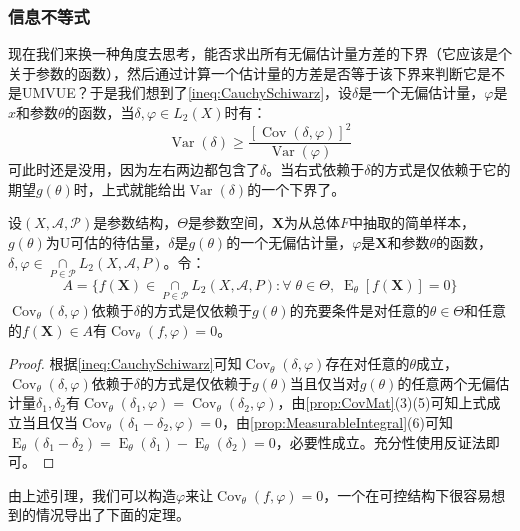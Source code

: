 \subsubsection{信息不等式}
现在我们来换一种角度去思考，能否求出所有无偏估计量方差的下界（它应该是个关于参数的函数），然后通过计算一个估计量的方差是否等于该下界来判断它是不是UMVUE？于是我们想到了\cref{ineq:CauchySchiwarz}，设$\delta$是一个无偏估计量，$\varphi$是$x$和参数$\theta$的函数，当$\delta,\varphi\in L_2(X)$时有：
\begin{equation*}
	\operatorname{Var}(\delta)\geqslant\frac{[\operatorname{Cov}(\delta,\varphi)]^2}{\operatorname{Var}(\varphi)}
\end{equation*}
可此时还是没用，因为左右两边都包含了$\delta$。当右式依赖于$\delta$的方式是仅依赖于它的期望$g(\theta)$时，上式就能给出$\operatorname{Var}(\delta)$的一个下界了。
\begin{lemma}
	设$(X,\mathscr{A},\mathscr{P})$是参数结构，$\Theta$是参数空间，$\mathbf{X}$为从总体$F$中抽取的简单样本，$g(\theta)$为U可估的待估量，$\delta$是$g(\theta)$的一个无偏估计量，$\varphi$是$\mathbf{X}$和参数$\theta$的函数，$\delta,\varphi\in\underset{P\in\mathscr{P}}{\cap}L_2(X,\mathscr{A},P)$。令：
	\begin{equation*}
		A=\{f(\mathbf{X})\in\underset{P\in\mathscr{P}}{\cap}L_2(X,\mathscr{A},P):\forall\;\theta\in\Theta,\;\operatorname{E}_{\theta}[f(\mathbf{X})]=0\}
	\end{equation*}
	$\operatorname{Cov}_{\theta}(\delta,\varphi)$依赖于$\delta$的方式是仅依赖于$g(\theta)$的充要条件是对任意的$\theta\in\Theta$和任意的$f(\mathbf{X})\in A$有$\operatorname{Cov}_{\theta}(f,\varphi)=0$。
\end{lemma}
\begin{proof}
	根据\cref{ineq:CauchySchiwarz}可知$\operatorname{Cov}_{\theta}(\delta,\varphi)$存在对任意的$\theta$成立，$\operatorname{Cov}_{\theta}(\delta,\varphi)$依赖于$\delta$的方式是仅依赖于$g(\theta)$当且仅当对$g(\theta)$的任意两个无偏估计量$\delta_1,\delta_2$有$\operatorname{Cov}_{\theta}(\delta_1,\varphi)=\operatorname{Cov}_{\theta}(\delta_2,\varphi)$，由\cref{prop:CovMat}(3)(5)可知上式成立当且仅当$\operatorname{Cov}_{\theta}(\delta_1-\delta_2,\varphi)=0$，由\cref{prop:MeasurableIntegral}(6)可知$\operatorname{E}_{\theta}(\delta_1-\delta_2)=\operatorname{E}_{\theta}(\delta_1)-\operatorname{E}_{\theta}(\delta_2)=0$，必要性成立。充分性使用反证法即可。
\end{proof}
\begin{note}
	由上述引理，我们可以构造$\varphi$来让$\operatorname{Cov}_{\theta}(f,\varphi)=0$，一个在可控结构下很容易想到的情况导出了下面的定理。
\end{note}
